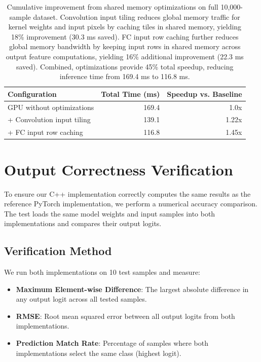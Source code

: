 \documentclass[11pt]{article}
\begin{document}
\begin{table}[h]
\centering
\begin{tabular}{lrr}
\toprule
Configuration & Total Time (ms) & Speedup vs. Baseline \\
\midrule
GPU without optimizations & 169.4 & 1.0x \\
+ Convolution input tiling & 139.1 & 1.22x \\
+ FC input row caching & 116.8 & 1.45x \\
\bottomrule
\end{tabular}
\caption{Cumulative improvement from shared memory optimizations on full 10,000-sample dataset. Convolution input tiling reduces global memory traffic for kernel weights and input pixels by caching tiles in shared memory, yielding 18\% improvement (30.3 ms saved). FC input row caching further reduces global memory bandwidth by keeping input rows in shared memory across output feature computations, yielding 16\% additional improvement (22.3 ms saved). Combined, optimizations provide 45\% total speedup, reducing inference time from 169.4 ms to 116.8 ms.}
\label{tab:optimization}
\end{table}

\section{Output Correctness Verification}

To ensure our C++ implementation correctly computes the same results as the reference PyTorch implementation, we perform a numerical accuracy comparison. The test loads the same model weights and input samples into both implementations and compares their output logits.

\subsection{Verification Method}

We run both implementations on 10 test samples and measure:
\begin{itemize}
    \item \textbf{Maximum Element-wise Difference}: The largest absolute difference in any output logit across all tested samples.
    \item \textbf{RMSE}: Root mean squared error between all output logits from both implementations.
    \item \textbf{Prediction Match Rate}: Percentage of samples where both implementations select the same class (highest logit).
\end{itemize}
\end{document}
